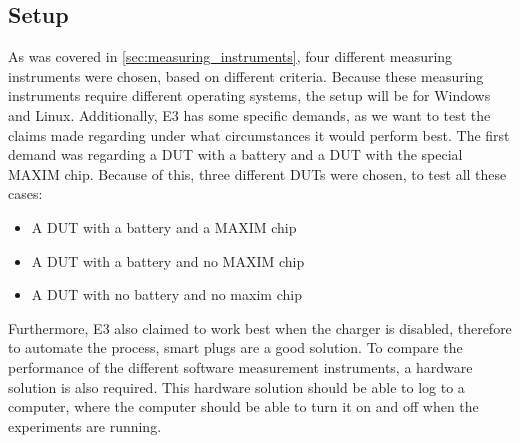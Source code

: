 \subsection{Setup}

As was covered in \cref*{sec:measuring_instruments}, four different measuring instruments were chosen, based on different criteria. Because these measuring instruments require different operating systems, the setup will be for Windows and Linux. Additionally, E3 has some specific demands, as we want to test the claims made regarding under what circumstances it would perform best\cite*{E3Doc,E3Video}. The first demand was regarding a DUT with a battery and a DUT with the special MAXIM chip. Because of this, three different DUTs were chosen, to test all these cases:

\begin{itemize}
    \item A DUT with a battery and a MAXIM chip
    \item A DUT with a battery and no MAXIM chip
    \item A DUT with no battery and no maxim chip
\end{itemize}

Furthermore, E3 also claimed to work best when the charger is disabled, therefore to automate the process, smart plugs are a good solution. To compare the performance of the different software measurement instruments, a hardware solution is also required. This hardware solution should be able to log to a computer, where the computer should be able to turn it on and off when the experiments are running.